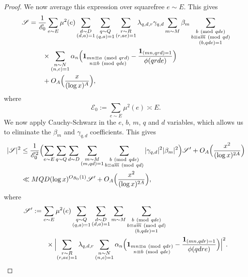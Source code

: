 \documentclass[10pt]{amsart}
\theoremstyle{plain}
\numberwithin{equation}{section}
\newcommand{\Mod}[1]{\ (\mathrm{mod}\ #1)}
\begin{document}
\begin{proof}
We now average this expression over squarefree $e\sim E$. This gives
\begin{align*}
\mathscr{S}&=\frac{1}{\mathscr{E}_0}\sum_{e\sim E}\mu^2(e)\sum_{\substack{d\sim D\\ (d,a)=1}}\sum_{\substack{q\sim Q\\ (q,a)=1}}\sum_{\substack{r\sim R\\ (r,a e)=1}}\lambda_{q,d,r}\gamma_{q,d}\sum_{m\sim M}\beta_m\sum_{\substack{b\Mod{q d e}\\ b\equiv a\overline{m}\Mod{q d}\\ (b,q d e)=1}}\\
&\qquad\times\sum_{\substack{n\sim N\\ (n,e)=1}}\alpha_n\Bigl(\mathbf{1}_{\substack{m n\equiv a\Mod{q r d}\\ n\equiv b\Mod{q d e}}}-\frac{\mathbf{1}_{(m n,q r d)=1}}{\phi(q r d e)}\Bigr)\\
&\qquad +O_A\Bigl(\frac{x}{(\log{x})^A}\Bigr),
\end{align*}
where
\[
\mathscr{E}_0:=\sum_{e\sim E} \mu^2(e)\asymp E.
\]
We now apply Cauchy-Schwarz in the $e$, $b$, $m$, $q$ and $d$ variables, which allows us to eliminate the $\beta_m$ and $\gamma_{q,d}$ coefficients. This gives
\begin{align*}
|\mathscr{S}|^2
&\le \frac{1}{\mathscr{E}_0^2}\Bigl(\sum_{e\sim E}\sum_{q\sim Q} \sum_{d\sim D}\sum_{\substack{m\sim M\\ (m,q d)=1}}\sum_{\substack{b\Mod{q d e}\\ b\equiv a\overline{m}\Mod{q d}}}|\gamma_{q,d}|^2|\beta_m|^2\Bigr)  \mathscr{S}'+O_A\Bigl(\frac{x^2}{(\log{x})^{2A}}\Bigr)\\
&\ll M Q D(\log{x})^{O_{B_0}(1)} \mathscr{S}'+O_A\Bigl(\frac{x^2}{(\log{x})^{2A}}\Bigr),
\end{align*}
where 
\begin{align*}
\mathscr{S}'&:=\sum_{e\sim E}\mu^2(e)\sum_{\substack{q\sim Q\\ (q,a)=1}}\sum_{\substack{d\sim D\\ (d,a)=1}}\sum_{m\sim M}\sum_{\substack{b\Mod{q d e}\\ b\equiv a\overline{m}\Mod{q d}\\ (b,q d e )=1}}\\
&\qquad\times\Bigl|\sum_{\substack{r\sim R\\ (r,a e)=1}}\lambda_{q,d,r}\sum_{\substack{n\sim N\\ (n,e)=1}}\alpha_n\Bigl(\mathbf{1}_{\substack{m n\equiv a\Mod{q d r}\\ n\equiv b\Mod{q d e}}}-\frac{\mathbf{1}_{(m n,qd r)=1}}{\phi(q d r e)}\Bigr)\Bigr|^2.

\end{align*}
\end{proof}
\end{document}
